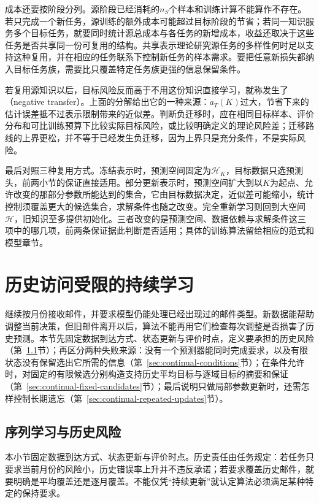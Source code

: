 成本还要按阶段分列。源阶段已经消耗的$n_S$个样本和训练计算不能算作不存在。若只完成一个新任务，源训练的额外成本可能超过目标阶段的节省；若同一知识服务多个目标任务，就要同时统计源总成本与各任务的新增成本，收益还取决于这些任务是否共享同一份可复用的结构。共享表示理论研究源任务的多样性何时足以支持这种复用，并在相应的任务联系下控制新任务的样本需求。要把任意新损失都纳入目标任务族，需要比只覆盖特定任务族更强的信息保留条件。

若复用源知识以后，目标风险反而高于不用这份知识直接学习，就称发生了（negative transfer）。上面的分解给出它的一种来源：$a_T(K)$过大，节省下来的估计误差抵不过表示限制带来的近似差。判断负迁移时，应在相同目标样本、评价分布和可比训练预算下比较实际目标风险，或比较明确定义的理论风险差；迁移路线的上界更松，并不等于已经发生负迁移，因为上界只是充分条件，不是实际风险。

最后对照三种复用方式。冻结表示时，预测空间固定为$\mathcal H_K$，目标数据只选预测头，前两小节的保证直接适用。部分更新表示时，预测空间扩大到以$K$为起点、允许改变的那部分参数所能达到的集合，它由目标数据决定，近似差可能缩小，统计控制须覆盖更大的候选集合，求解条件也随之改变。完全重新学习则回到大空间$\mathcal H$，旧知识至多提供初始化。三者改变的是预测空间、数据依赖与求解条件这三项中的哪几项，前两条保证据此判断是否适用；具体的训练算法留给相应的范式和模型章节。
\section{历史访问受限的持续学习}
\label{sec:continual-learnability}

继续按月份接收邮件，并要求模型仍能处理已经出现过的邮件类型。新数据能帮助调整当前决策，但旧邮件离开以后，算法不能再用它们检查每次调整是否损害了历史预测。本节先固定数据到达方式、状态更新与评价时点，定义要承担的历史风险（第~\ref{sec:continual-protocol}节）；再区分两种失败来源：没有一个预测器能同时完成要求，以及有限状态没有保留选出它所需的信息（第~\ref{sec:continual-conditions}节）；在条件允许时，对固定的有限候选分别构造支持历史平均目标与逐域目标的摘要和保证（第~\ref{sec:continual-fixed-candidates}节）；最后说明只做局部参数更新时，还需怎样控制长期遗忘（第~\ref{sec:continual-repeated-updates}节）。

\subsection{序列学习与历史风险}
\label{sec:continual-protocol}

本小节固定数据到达方式、状态更新与评价时点。历史责任由任务规定：若任务只要求当前月份的风险小，历史错误率上升并不违反承诺；若要求覆盖历史邮件，就要明确是平均覆盖还是逐月覆盖。不能仅凭“持续更新”就认定算法必须满足某种特定的保持要求。

